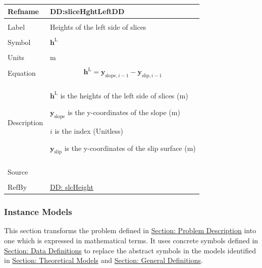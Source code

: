 \documentclass[12pt]{article}
\begin{document}
\vspace{\baselineskip}
\noindent
\begin{minipage}{\textwidth}
\begin{tabular}{>{\raggedright}p{}>{\raggedright\arraybackslash}p{}}
\toprule \textbf{Refname} & \textbf{DD:sliceHghtLeftDD}
\label{DD:sliceHghtLeftDD}
\\ \midrule \\
Label & Heights of the left side of slices
        
\\ \midrule \\
Symbol & ${\mathbf{h}^{\text{L}}}$
         
\\ \midrule \\
Units & m
        
\\ \midrule \\
Equation & \begin{displaymath}
           {\mathbf{h}^{\text{L}}}={\mathbf{y}_{\text{slope},i-1}}-{\mathbf{y}_{\text{slip},i-1}}
           \end{displaymath}
\\ \midrule \\
Description & \begin{symbDescription}
              \item{${\mathbf{h}^{\text{L}}}$ is the heights of the left side of slices (m)}
              \item{${\mathbf{y}_{\text{slope}}}$ is the y-coordinates of the slope (m)}
              \item{$i$ is the index (Unitless)}
              \item{${\mathbf{y}_{\text{slip}}}$ is the y-coordinates of the slip surface (m)}
              \end{symbDescription}
\\ \midrule \\
Source & \cite{fredlund1977}
         
\\ \midrule \\
RefBy & \hyperref[DD:slcHeight]{DD: slcHeight}
        
\\ \bottomrule
\end{tabular}
\end{minipage}

\subsubsection{Instance Models}
\label{Sec:IMs}
This section transforms the problem defined in \hyperref[Sec:ProbDesc]{Section: Problem Description} into one which is expressed in mathematical terms. It uses concrete symbols defined in \hyperref[Sec:DDs]{Section: Data Definitions} to replace the abstract symbols in the models identified in \hyperref[Sec:TMs]{Section: Theoretical Models} and \hyperref[Sec:GDs]{Section: General Definitions}.
\end{document}
